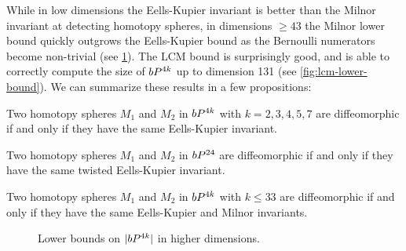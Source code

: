 While in low dimensions the Eells-Kupier invariant is better than the Milnor invariant at detecting homotopy spheres, in dimensions $\geq 43$ the Milnor lower bound quickly outgrows the Eells-Kupier bound as the Bernoulli numerators become non-trivial (see \cref{fig:high-dim-lower-bound}). The LCM bound is surprisingly good, and is able to correctly compute the size of $bP^{4k}$ up to dimension 131 (see \cref{fig:lcm-lower-bound}).
We can summarize these results in a few propositions:

\begin{proposition}
	Two homotopy spheres $M_1$ and $M_2$ in $bP^{4k}$ with $k=2,3,4,5,7$ are diffeomorphic if and only if they have the same Eells-Kupier invariant.
\end{proposition}

\begin{proposition}
	Two homotopy spheres $M_1$ and $M_2$ in $bP^{24}$ are diffeomorphic if and only if they have the same twisted Eells-Kupier invariant.
\end{proposition}

\begin{proposition}
	Two homotopy spheres $M_1$ and $M_2$ in $bP^{4k}$ with $k\leq 33$ are diffeomorphic if and only if they have the same Eells-Kupier and Milnor invariants.
\end{proposition}

\begin{figure}[H]
	\centering

	\caption{Lower bounds on $|bP^{4k}|$ in higher dimensions.}\label{fig:high-dim-lower-bound}
\end{figure}

